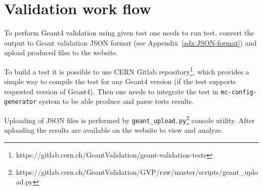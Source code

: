 \section{Validation work flow}
\label{sec-workflow}

To perform Geant4 validation using given test one needs to run test, convert the output to Geant validation JSON format (see Appendix~\ref{adx:JSON-format}) and upload produced files to the website.

To build a test it is possible to use CERN Gitlab repository\footnote{https://gitlab.cern.ch/GeantValidation/geant-validation-tests}, which provides a simple way to compile the test for any Geant4 version (if the test supports requested version of Geant4).
Then one needs to integrate the test in {\tt mc-config-generator} system to be able produce and parse tests results.

Uploading of JSON files is performed by {\tt geant\_upload.py}\footnote{https://gitlab.cern.ch/GeantValidation/GVP/raw/master/scripts/geant\_upload.py} console utility.
After uploading the results are available on the website to view and analyze.